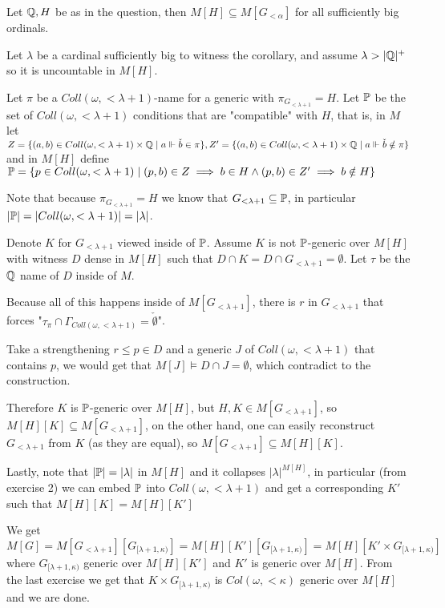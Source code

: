 \begin{cExercise}
\begin{cPart}
		\begin{corollary}
			Let $\Q,H$ be as in the question, then $M[H]\subseteq M[G_{<\alpha}]$ for all sufficiently big ordinals.
		\end{corollary}
		
		Let $\lambda$ be a cardinal sufficiently big to witness the corollary, and assume $\lambda>|\Q|^+$ so it is uncountable in $M[H]$.
		
		Let $\pi$ be a $Coll(\omega,<\lambda+1)$-name for a generic with $\pi_{G_{<\lambda+1}}=H$. Let $\P$ be the set of $Coll(\omega,<\lambda+1)$ conditions that are "compatible" with $H$, that is, in $M$ let $Z=\{(a,b)\in Coll(\omega,<\lambda+1)\times \Q\mid a\force \check b\in \pi\},Z'=\{(a,b)\in Coll(\omega,<\lambda+1)\times \Q\mid a\force \check b\notin \pi\}$ and in $M[H]$ define $\P=\{p\in Coll(\omega,<\lambda+1)\mid (p,b)\in Z\implies b\in H\land (p,b)\in Z'\implies b\notin H\}$
		
		Note that because $\pi_{G_{<\lambda+1}}=H$ we know that $G_{<\lambda+1}\subseteq \P$, in particular $|\P|=|Coll(\omega,<\lambda+1)|=|\lambda|$.
		
		Denote $K$ for $G_{<\lambda+1}$ viewed inside of $\P$. Assume $K$ is not $\P$-generic over $M[H]$ with witness $D$ dense in $M[H]$ such that $D\cap K=D\cap G_{<\lambda+1}=\emptyset$. Let $\tau$ be the $\Q$ name of $D$ inside of $M$.
		
		Because all of this happens inside of $M[G_{<\lambda+1}]$, there is $r$ in $G_{<\lambda+1}$ that forces "$\tau_\pi\cap \Gamma_{Coll(\omega,<\lambda+1)}=\check\emptyset$".
		
		Take a strengthening $r\le p\in D$ and a generic $J$ of $Coll(\omega,<\lambda+1)$ that contains $p$, we would get that $M[J]\models D\cap J=\emptyset$, which contradict to the construction.
		
		Therefore $K$ is $\P$-generic over $M[H]$, but $H,K\in M[G_{<\lambda+1}]$, so $M[H][K]\subseteq M[G_{<\lambda+1}]$, on the other hand, one can easily reconstruct $G_{<\lambda+1}$ from $K$ (as they are equal), so $M[G_{<\lambda+1}]\subseteq M[H][K]$.
		
		Lastly, note that $|\P|=|\lambda|$ in $M[H]$ and it collapses $|\lambda|^{M[H]}$, in particular (from exercise 2) we can embed $\P$ into $Coll(\omega,<\lambda+1)$ and get a corresponding $K'$ such that $M[H][K]=M[H][K']$
		
		We get $M[G]=M[G_{<\lambda+1}][G_{[\lambda+1,\kappa)}]=M[H][K'][G_{[\lambda+1,\kappa)}]=M[H][K'\times G_{[\lambda+1,\kappa)}]$ where $G_{[\lambda+1,\kappa)}$ generic over $M[H][K']$ and $K'$ is generic over $M[H]$. From the last exercise we get that $K\times G_{[\lambda+1,\kappa)}$ is $Col(\omega,<\kappa)$ generic over $M[H]$ and we are done.
	\end{cPart}
\end{cExercise}





